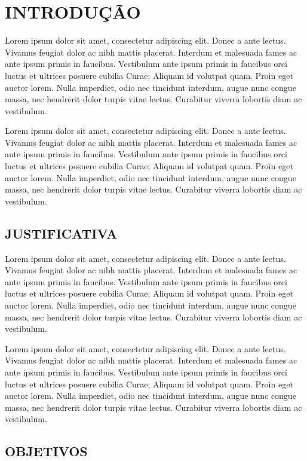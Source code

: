 \chapter{INTRODUÇÃO}
\label{chp:intro}

Lorem ipsum dolor sit amet, consectetur adipiscing elit. Donec a ante lectus. Vivamus feugiat dolor ac nibh mattis placerat. Interdum et malesuada fames ac ante ipsum primis in faucibus. Vestibulum ante ipsum primis in faucibus orci luctus et ultrices posuere cubilia Curae; Aliquam id volutpat quam. Proin eget auctor lorem. Nulla imperdiet, odio nec tincidunt interdum, augue nunc congue massa, nec hendrerit dolor turpis vitae lectus. Curabitur viverra lobortis diam ac vestibulum.

Lorem ipsum dolor sit amet, consectetur adipiscing elit. Donec a ante lectus. Vivamus feugiat dolor ac nibh mattis placerat. Interdum et malesuada fames ac ante ipsum primis in faucibus. Vestibulum ante ipsum primis in faucibus orci luctus et ultrices posuere cubilia Curae; Aliquam id volutpat quam. Proin eget auctor lorem. Nulla imperdiet, odio nec tincidunt interdum, augue nunc congue massa, nec hendrerit dolor turpis vitae lectus. Curabitur viverra lobortis diam ac vestibulum.

\section{JUSTIFICATIVA}
Lorem ipsum dolor sit amet, consectetur adipiscing elit. Donec a ante lectus. Vivamus feugiat dolor ac nibh mattis placerat. Interdum et malesuada fames ac ante ipsum primis in faucibus. Vestibulum ante ipsum primis in faucibus orci luctus et ultrices posuere cubilia Curae; Aliquam id volutpat quam. Proin eget auctor lorem. Nulla imperdiet, odio nec tincidunt interdum, augue nunc congue massa, nec hendrerit dolor turpis vitae lectus. Curabitur viverra lobortis diam ac vestibulum.

Lorem ipsum dolor sit amet, consectetur adipiscing elit. Donec a ante lectus. Vivamus feugiat dolor ac nibh mattis placerat. Interdum et malesuada fames ac ante ipsum primis in faucibus. Vestibulum ante ipsum primis in faucibus orci luctus et ultrices posuere cubilia Curae; Aliquam id volutpat quam. Proin eget auctor lorem. Nulla imperdiet, odio nec tincidunt interdum, augue nunc congue massa, nec hendrerit dolor turpis vitae lectus. Curabitur viverra lobortis diam ac vestibulum.

\section{OBJETIVOS}

